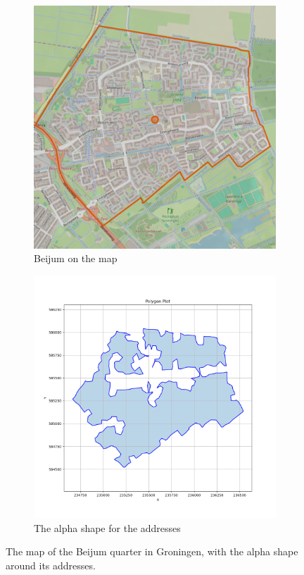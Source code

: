 \begin{figure}[H]
	\centering
	\begin{subfigure}[b]{0.45\textwidth}
		\includegraphics[width=\textwidth]{Pictures/Beijum_quarter.png}
		\caption{Beijum on the map}
		\label{fig:Beijummap}
	\end{subfigure}
	\hfill
	\begin{subfigure}[b]{0.45\textwidth}
		\includegraphics[width=\textwidth]{Pictures/hull_beijum.png}
		\caption{The alpha shape for the addresses}
		\label{fig:AlphaBeijum}
	\end{subfigure}
	\caption{The map of the Beijum quarter in Groningen, with the alpha shape around its addresses.}
	\label{fig:Beijum}
\end{figure}
